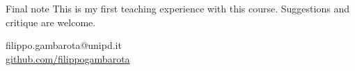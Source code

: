 \documentclass[
  ignorenonframetext,
]{beamer}
\begin{document}
\begin{frame}{Final note}
\protect\hypertarget{final-note}{}
This is my first teaching experience with this course. Suggestions and
critique are welcome.
\end{frame}

\begin{frame}[plain]
\begin{center}
  \faEnvelope \hspace{0.2cm} filippo.gambarota@unipd.it\\
  \vspace{0.5cm}
  \faGithub \hspace{0.2cm} \href{github.com/filippogambarota}{github.com/filippogambarota}
\end{center}
\end{frame}
\end{document}
